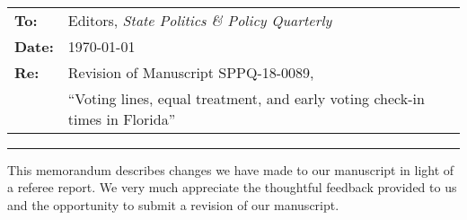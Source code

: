 \documentclass[12pt]{article}
\begin{document}
\thispagestyle{empty}

\\[0.5in]

\noindent
\begin{tabular}{ll}
  \textbf{To:} &  Editors, \emph{State Politics \& Policy Quarterly}\\
  \textbf{Date:} & \today \\
  \textbf{Re:} & Revision of Manuscript SPPQ-18-0089,\\& ``Voting lines, equal treatment, and early voting check-in times in Florida''
\end{tabular}


\vspace{.1in}
\hrule
\vspace{.2in}

\noindent This memorandum describes changes we have made to our
manuscript in light of a referee report. We very much appreciate the
thoughtful feedback provided to us and the opportunity to submit a
revision of our manuscript.
\end{document}
